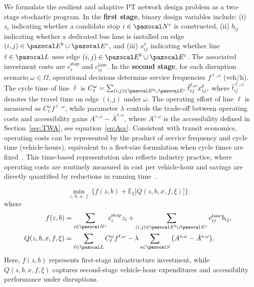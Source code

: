 \documentclass[3p,times,procedia]{elsarticle}
\begin{document}
We formulate the resilient and adaptive PT network design problem as a two-stage stochastic program.  
In the \textbf{first stage}, binary design variables include: (i) $z_i$ indicating whether a candidate stop $i \in \pazocal N^c$ is constructed, (ii) $b_{ij}$ indicating whether a dedicated bus lane is installed on edge $(i,j) \in \pazocal E^b \cup \pazocal E^c$, and (iii) $x_{ij}^{\ell}$ indicating whether line $\ell \in \pazocal L$ uses edge $(i,j) \in \pazocal E^b \cup \pazocal E^c$. The associated investment costs are $c_i^{\text{stop}}$ and $c_{ij}^{\text{lane}}$.  
In the \textbf{second stage}, for each disruption scenario $\omega \in \Omega$, operational decisions determine service frequencies $f^{\ell,\omega}$ (veh/h). The cycle time of line $\ell$ is
$
C_{\ell}^{\omega}=\sum_{(i,j)\in \pazocal E^b \cup \pazocal E^c}\hat{t}_{ij}^{\ell,\omega}x_{ij}^{\ell},
$
where $\hat{t}_{ij}^{\ell,\omega}$ denotes the travel time on edge $(i,j)$ under $\omega$. The operating effort of line $\ell$ is measured as $C_{\ell}^{\omega} f^{\ell,\omega}$, while parameter $\lambda$ controls the trade-off between operating costs and accessibility gains $A^{s,\omega}-\bar{A}^{s,\omega}$,  where $A^{s,\omega}$ is the accessibility defined in Section~\ref{sec:TWA}, see equation~\eqref{eq:Acc}.   
Consistent with transit economics, operating costs can be represented by the product of service frequency and cycle time (vehicle-hours), equivalent to a fleet-size formulation when cycle times are fixed~\citep{horcher2021public}. This time-based representation also reflects industry practice, where operating costs are routinely measured in cost per vehicle-hour and savings are directly quantified by reductions in running time~\citep{tcrp118}.

\begin{equation}
\min\limits_{z,\,b,\,x,\,f}\ \Big\{ f(z,b) + \mathbb{E}_{\xi}\big[Q(z,b,x,f,\xi)\big] \Big\}
\label{eq:obj}
\end{equation}
where
\begin{align}
f(z,b) &= \sum_{i \in \pazocal N^c} c_i^{\text{stop}} z_i 
+ \sum_{(i,j) \in \pazocal E^b \cup \pazocal E^c} c_{ij}^{\text{lane}} b_{ij}, 
\label{eq:obj1} \\
Q(z,b,x,f,\xi) &= \sum_{\ell \in \pazocal L} C_{\ell}^{\omega} f^{\ell,\omega} 
- \lambda \sum_{s \in \pazocal S} \big(A^{s,\omega}-\bar{A}^{s,\omega}\big).
\label{eq:obj2}
\end{align}
%
Here, $f(z,b)$ represents first-stage infrastructure investment, while $Q(z,b,x,f,\xi)$ captures second-stage vehicle-hour expenditures and accessibility performance under disruptions.
\end{document}
